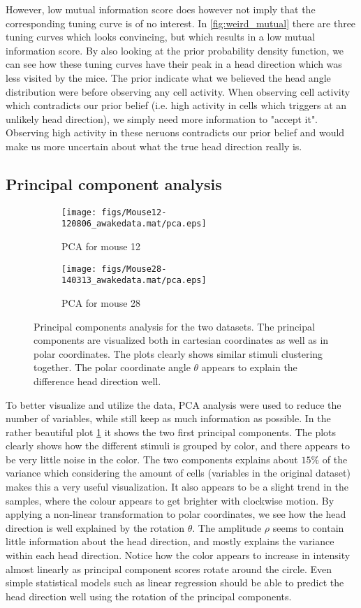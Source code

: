 However, low mutual information score does however not imply that the corresponding tuning curve is of no interest. In \cref{fig:weird_mutual} there are three tuning curves which looks convincing, but which results in a low mutual information score. By also looking at the prior probability density function, we can see how these tuning curves have their peak in a head direction which was less visited by the mice. The prior indicate what we believed the head angle distribution were before observing any cell activity. When observing cell activity which contradicts our prior belief (i.e. high activity in cells which triggers at an unlikely head direction), we simply need more information to "accept it". Observing high activity in these neruons contradicts our prior belief and would make us more uncertain about what the true head direction really is. 

\subsection{Principal component analysis}
\begin{figure}[H]
    \centering
    \begin{subfigure}[b]{0.49\textwidth}
        \texttt{[image: figs/Mouse12-120806\_awakedata.mat/pca.eps]}
        \caption{PCA for mouse 12}
    \end{subfigure}
    \begin{subfigure}[b]{0.49\textwidth}
        \texttt{[image: figs/Mouse28-140313\_awakedata.mat/pca.eps]}
        \caption{PCA for mouse 28}

    \end{subfigure}
    \caption{Principal components analysis for the two datasets. The principal components are visualized both in cartesian coordinates as well as in polar coordinates. The plots clearly shows similar stimuli clustering together. The polar coordinate angle $\theta$ appears to explain the difference head direction well.}
    \label{fig:pca}
\end{figure}
To better visualize and utilize the data, PCA analysis were used to reduce the number of variables, while still keep as much information as possible. In the rather beautiful plot \cref{fig:pca} it shows the two first principal components. The plots clearly shows how the different stimuli is grouped by color, and there appears to be very little noise in the color. The two components explains about $15\%$ of the variance which considering the amount of cells (variables in the original dataset) makes this a very useful visualization. 
It also appears to be a slight trend in the samples, where the colour appears to get brighter with clockwise motion. By applying a non-linear transformation to polar coordinates, we see how the head direction is well explained by the rotation $\theta$. The amplitude $\rho$ seems to contain little information about the head direction, and mostly explains the variance within each head direction. Notice how the color appears to increase in intensity almost linearly as principal component scores rotate around the circle. Even simple statistical models such as linear regression should be able to predict the head direction well using the rotation of the principal components.
